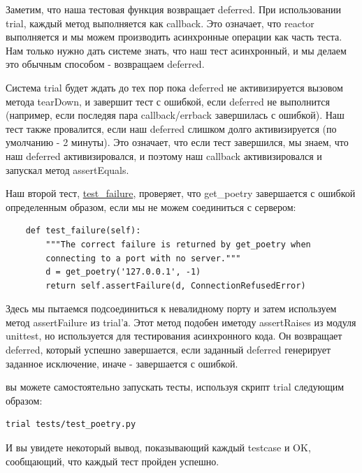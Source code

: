 Заметим, что наша тестовая функция возвращает deferred. 
При использовании trial, каждый метод выполняется как 
callback. Это означает, что reactor выполняется и  мы 
можем производить асинхронные операции как часть теста. 
Нам только нужно дать системе знать, что наш тест асинхронный, 
и мы делаем это обычным способом - возвращаем deferred.


Система trial будет ждать до тех пор пока deferred не 
активизируется вызовом метода tearDown, и завершит тест 
с ошибкой, если deferred не выполнится (например, если 
последяя пара callback/errback завершилась с ошибкой). 
Наш тест также провалится, если наш deferred слишком 
долго активизируется (по умолчанию - 2 минуты). Это означает, 
что если тест завершился, мы знаем, что наш deferred 
активизировался, и поэтому наш callback 
активизировался и запускал метод assertEquals.


Наш второй тест, 
\href{http://github.com/jdavisp3/twisted-intro/blob/master/tests/test\_poetry.py#L91}{test\_failure}, 
проверяет, что get\_poetry завершается с ошибкой 
определенным образом, если мы не можем соединиться 
с сервером:

\begin{scriptsize}\begin{verbatim}
    def test_failure(self):
        """The correct failure is returned by get_poetry when
        connecting to a port with no server."""
        d = get_poetry('127.0.0.1', -1)
        return self.assertFailure(d, ConnectionRefusedError)

\end{verbatim}\end{scriptsize}


Здесь мы пытаемся подсоединиться к невалидному 
порту и затем используем метод assertFailure из trial'а. Этот 
метод подобен иметоду assertRaises из модуля unittest, но 
используется для тестирования асинхронного кода. Он 
возвращает deferred, который успешно завершается, если 
заданный deferred генерирует заданное исключение, 
иначе - завершается с ошибкой.


вы можете самостоятельно запускать тесты, используя скрипт trial 
следующим образом:

\begin{scriptsize}\begin{verbatim}
trial tests/test_poetry.py
\end{verbatim}\end{scriptsize}


И вы увидете некоторый вывод, показывающий 
каждый testcase и OK, сообщающий, что каждый 
тест пройден успешно.


